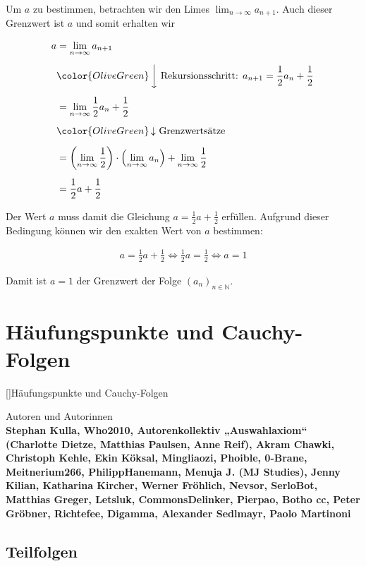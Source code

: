 \documentclass[fontsize=9pt,
               parskip=half-,
               DIV=14,
               listof=chapterentry,
               tocflat]{scrbook}
\newenvironment{authors}{\par\vspace*{\fill}\color{white}Autoren und
Autorinnen\\\bfseries}{\clearpage}
\begin{document}
Um $a$ zu bestimmen, betrachten wir den Limes $\lim _{n\to \infty }a_{n+1}$. Auch dieser Grenzwert ist $a$ und somit erhalten wir

\begin{align*}
a&=\lim _{n\to \infty }a_{n+1}\\[0.5em]&{\color {OliveGreen}\left\downarrow \ {\text{Rekursionsschritt: }}a_{n+1}={\frac {1}{2}}a_{n}+{\frac {1}{2}}\right.}\\[0.5em]&=\lim _{n\to \infty }{\frac {1}{2}}a_{n}+{\frac {1}{2}}\\[0.5em]&{\color {OliveGreen}\left\downarrow \ {\text{Grenzwertsätze}}\right.}\\[0.5em]&=\left(\lim _{n\to \infty }{\frac {1}{2}}\right)\cdot \left(\lim _{n\to \infty }a_{n}\right)+\lim _{n\to \infty }{\frac {1}{2}}\\[0.5em]&={\frac {1}{2}}a+{\frac {1}{2}}
\end{align*}

Der Wert $a$ muss damit die Gleichung $a={\tfrac {1}{2}}a+{\tfrac {1}{2}}$ erfüllen. Aufgrund dieser Bedingung können wir den exakten Wert von $a$ bestimmen:

\begin{align*}
a={\frac {1}{2}}a+{\frac {1}{2}}\iff {\frac {1}{2}}a={\frac {1}{2}}\iff a=1
\end{align*}

Damit ist $a=1$ der Grenzwert der Folge $(a_{n})_{n\in \mathbb {N} }$.

\part[Häufungspunkte und Cauchy-Folgen]{\changefontsizes[59pt]{40pt}\color{white} Häufungspunkte und Cauchy-Folgen}

[]{Häufungspunkte und Cauchy-Folgen}\begin{authors}
Stephan Kulla, Who2010, Autorenkollektiv „Auswahlaxiom“ (Charlotte Dietze, Matthias Paulsen, Anne Reif), Akram Chawki, Christoph Kehle, Ekin Köksal, Mingliaozi, Phoible, 0-Brane, Meitnerium266, PhilippHanemann, Menuja J. (MJ Studies), Jenny Kilian, Katharina Kircher, Werner Fröhlich, Nevsor, SerloBot, Matthias Greger, Letsluk, CommonsDelinker, Pierpao, Botho cc, Peter Gröbner, Richtefee, Digamma, Alexander Sedlmayr, Paolo Martinoni\end{authors}

\chapter{Teilfolgen}
\end{document}
